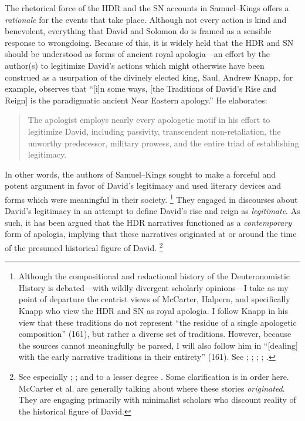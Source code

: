 The rhetorical force of the HDR and the SN accounts in Samuel--Kings offers a \emph{rationale} for the events that take place. Although not every action is kind and benevolent, everything that David and Solomon do is framed as a sensible response to wrongdoing. Because of this, it is widely held that the HDR and SN should be understood as forms of ancient royal apologia---an effort by the author(s) to legitimize David's actions which might otherwise have been construed as a usurpation of the divinely elected king, Saul. Andrew Knapp, for example, observes that ``[i]n some ways, [the Traditions of David's Rise and Reign] is the paradigmatic ancient Near Eastern apology.''%
    \autocite[218]{knapp2015}
He elaborates:
\begin{quote}
    The apologist employs nearly every apologetic motif in his effort to legitimize David, including passivity, transcendent non-retaliation, the unworthy predecessor, military prowess, and the entire triad of establishing legitimacy.%
\autocite{knapp2015}
\end{quote}
\noindent
In other words, the authors of Samuel--Kings sought to make a forceful and potent argument in favor of David's legitimacy and used literary devices and forms which were meaningful in their society.%
    \footnote{Although the compositional and redactional history of the Deuteronomistic History is debated---with wildly divergent scholarly opinions---I take as my point of departure the centrist views of McCarter, Halpern, and specifically Knapp who view the HDR and SN as royal apologia. I follow Knapp in his view that these traditions do not represent ``the residue of a single apologetic composition'' (161), but rather a diverse set of traditions. However, because the sources cannot meaningfully be parsed, I will also follow him in ``[dealing] with the early narrative traditions in their entirety'' (161). See 
        \cite{knapp2015};
        \cite{mccarter_interpretation1981};
        \cite{mccarter_jbl1980};
        \cite{mccarter1980};
        \cite{halpern2001}.}
They engaged in discourses about David's legitimacy in an attempt to define David's rise and reign as \emph{legitimate}. As such, it has been argued that the HDR narratives functioned as a \emph{contemporary} form of apologia, implying that these narratives originated at or around the time of the presumed historical figure of David.%
    \footnote{See especially \cite{mccarter_interpretation1981}; \cite{mccarter_jbl1980}; and to a lesser degree \cite[75--76]{halpern2001}. Some clarification is in order here. McCarter et al. are generally talking about where these stories \emph{originated}. They are engaging primarily with minimalist scholars who discount reality of the historical figure of David.}
